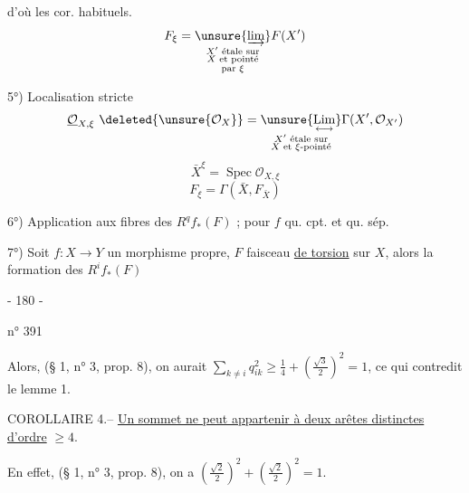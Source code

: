 d'où les cor. habituels.
\[
F_\xi=\underset{\substack{X'\text{ étale sur}\\X\text{ et pointé}\\\text{par }\xi}}{\unsure{\varinjlim}}F(X')
\]

5°) Localisation stricte
\[
\underline{\mathcal O}_{X,\xi}\ \deleted{\unsure{\mathcal O_X}}
=\underset{\substack{X'\text{ étale sur}\\X\text{ et }\xi\text{-pointé}}}
{\unsure{\mathop{\mathrm{Lim}}\limits_{\longleftrightarrow}}}
\Gamma(X',\mathcal O_{X'})
\]
\[
\bar X^\xi=\operatorname{Spec}\mathcal O_{X,\xi}
\]
\[
F_\xi=\Gamma(\bar X,F_{\bar X})
\]

6°) Application aux fibres des $R^q f_*(F)$ ; pour $f$ qu. cpt. et qu. sép.



7°)  Soit $f:X\longrightarrow Y$ un morphisme propre, $F$ faisceau \uline{de torsion} sur $X$, alors la formation des $R^i f_*(F)$

\begin{center}- 180 -\end{center}
\hfill n° 391

Alors, (§ 1, n° 3, prop. 8), on aurait $\sum_{k\ne i}q_{ik}^2\geq\frac14+(\frac{\sqrt3}{2})^2=1$, ce qui contredit le lemme 1.

COROLLAIRE 4.-- \uline{Un sommet ne peut appartenir à deux arêtes distinctes d'ordre} $\geq4$.

En effet, (§ 1, n° 3, prop. 8), on a $(\frac{\sqrt2}{2})^2+(\frac{\sqrt2}{2})^2=1$.

